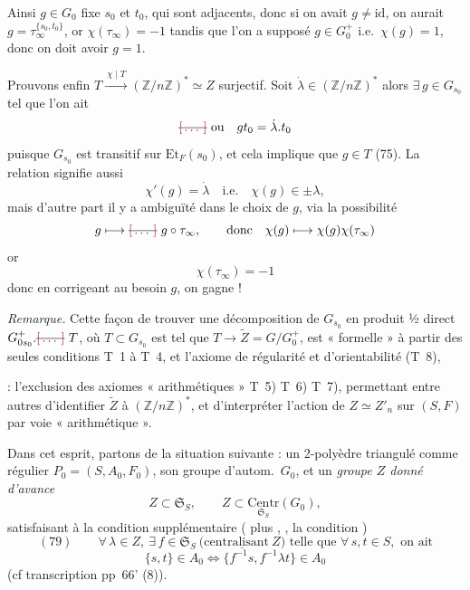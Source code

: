 \documentclass[11pt,a4paper]{article}
\begin{document}
Ainsi $g \in G_0$ fixe $s_0$ et $t_0$, qui sont adjacents, donc si on avait $g \neq \mathrm{id}$, on aurait $g = \tau_\infty^{\{s_0, t_0\}}$, or $\chi(\tau_\infty) = -1$  tandis que \struck{\ill{}} l'on a supposé $g \in G_0^{+}$ i.e.\ $\chi(g) = 1$, donc on doit avoir $g = 1$.

Prouvons enfin $T \xrightarrow{\ \chi \mid T\ } (\mathbb{Z}/n\mathbb{Z})^{*} \simeq Z$ surjectif. Soit $\dot\lambda \in (\mathbb{Z}/n\mathbb{Z})^{*}$  alors $\exists\, g \in G_{s_0}$ tel que l'on ait
\[
\text{\struck{\ill{}}}\ \text{ou} \quad g t_0 = \dot\lambda . t_0
\]
puisque $G_{s_0}$ est transitif sur $\mathrm{Et}_F(s_0)$, et cela implique que $g \in T$ (75). \struck{\ill{}} La relation \struck{\ill{}} signifie aussi
\[
\chi'(g) = \dot\lambda \quad \text{i.e.} \quad \chi(g) \in \pm \lambda ,
\]
mais d'autre part il y a ambiguïté dans le choix de $g$, via la possibilité
\[
g \longmapsto \text{\struck{\ill{}}}\ g \circ \tau_\infty , \qquad \text{donc} \quad \chi(g) \longmapsto \chi(g)\chi(\tau_\infty)
\]
or
\[
\chi(\tau_\infty) = -1
\]
donc en corrigeant au besoin $g$, on gagne !

\emph{Remarque.} Cette façon de trouver une décomposition de $G_{s_0}$ en produit ½ direct $G^{+}_{0 s_0} . \text{\struck{\ill{}}}\ T$, où $T \subset G_{s_0}$ est tel que $T \to \tilde{Z} = G/G_0^{+}$, est « formelle » à partir des seules conditions T~1 à T~4, et l'axiome de régularité et d'orientabilité (T~8),

: l'exclusion des axiomes « arithmétiques » T~5) T~6) T~7), permettant entre autres d'identifier $\tilde{Z}$ à $(\mathbb{Z}/n\mathbb{Z})^{*}$, et d'interpréter l'action de $Z \simeq Z'_n$ sur $(S, F)$ par voie « arithmétique ».

Dans cet esprit, partons de la situation suivante : un 2-polyèdre triangulé comme régulier $P_0 = (S, A_0, F_0)$, son groupe d'autom.\ $G_0$, et un \emph{groupe $Z$ donné d'avance}
\[
Z \subset \mathfrak{S}_S , \qquad Z \subset \underset{\mathfrak{S}_S}{\mathrm{Centr}}(G_0) ,
\]
satisfaisant à la condition supplémentaire ( plus ,       ,  la condition    )
\[
(79) \qquad \forall\, \lambda \in Z,\ \exists\, f \in \mathfrak{S}_S \ \bigl(\underline{\text{centralisant}\ Z}\bigr) \text{ telle que } \forall\, s, t \in S, \text{ on ait}
\]
\[
\{s, t\} \in A_0 \iff \{f^{-1} s, f^{-1} \lambda t\} \in A_0
\]
(cf transcription pp~66' (8)).
\end{document}

